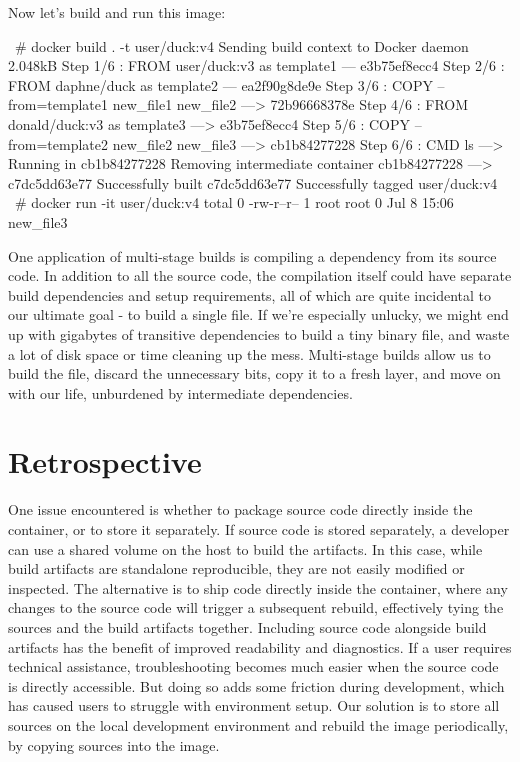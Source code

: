\documentclass[12pt,initial,twoside,maitrise]{dms}
\numberwithin{equation}{section}
\numberwithin{table}{chapter}
\numberwithin{figure}{chapter}
\begin{document}
Now let’s build and run this image:

\begin{pclisting}
~# docker build . -t user/duck:v4
Sending build context to Docker daemon  2.048kB
Step 1/6 : FROM user/duck:v3 as template1
--- e3b75ef8ecc4
Step 2/6 : FROM daphne/duck as template2
--- ea2f90g8de9e
Step 3/6 : COPY --from=template1 new_file1 new_file2
---> 72b96668378e
Step 4/6 : FROM donald/duck:v3 as template3
---> e3b75ef8ecc4
Step 5/6 : COPY --from=template2 new_file2 new_file3
---> cb1b84277228
Step 6/6 : CMD ls
---> Running in cb1b84277228
Removing intermediate container cb1b84277228
---> c7dc5dd63e77
Successfully built c7dc5dd63e77
Successfully tagged user/duck:v4
~# docker run -it user/duck:v4
total 0
-rw-r--r-- 1 root root 0 Jul  8 15:06 new_file3
\end{pclisting}

One application of multi-stage builds is compiling a dependency from its source code. In addition to all the source code, the compilation itself could have separate build dependencies and setup requirements, all of which are quite incidental to our ultimate goal - to build a single file. If we’re especially unlucky, we might end up with gigabytes of transitive dependencies to build a tiny binary file, and waste a lot of disk space or time cleaning up the mess. Multi-stage builds allow us to build the file, discard the unnecessary bits, copy it to a fresh layer, and move on with our life, unburdened by intermediate dependencies.

\section{Retrospective}

One issue encountered is whether to package source code directly inside the container, or to store it separately. If source code is stored separately, a developer can use a shared volume on the host to build the artifacts. In this case, while build artifacts are standalone reproducible, they are not easily modified or inspected. The alternative is to ship code directly inside the container, where any changes to the source code will trigger a subsequent rebuild, effectively tying the sources and the build artifacts together. Including source code alongside build artifacts has the benefit of improved readability and diagnostics. If a user requires technical assistance, troubleshooting becomes much easier when the source code is directly accessible. But doing so adds some friction during development, which has caused users to struggle with environment setup. Our solution is to store all sources on the local development environment and rebuild the image periodically, by copying sources into the image.
\end{document}
